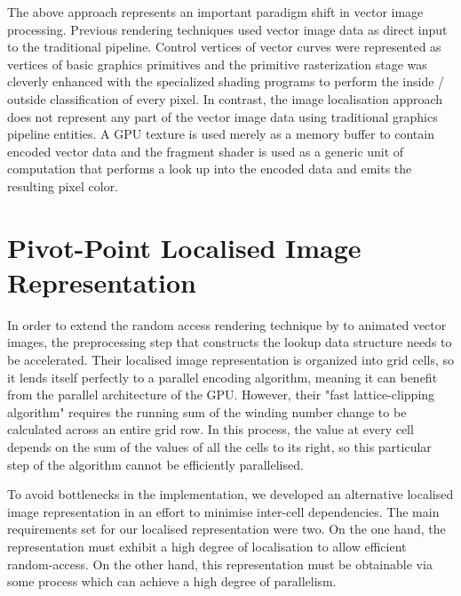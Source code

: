 \documentclass[11pt,a4paper,twoside]{article}
\begin{document}
The above approach represents an important paradigm shift in vector image processing. Previous rendering techniques used vector image data as direct input to the traditional pipeline. Control vertices of vector curves were represented as vertices of basic graphics primitives and the primitive rasterization stage was cleverly enhanced with the specialized shading programs to perform the inside / outside classification of every pixel. In contrast, the image localisation approach does not represent any part of the vector image data using traditional graphics pipeline entities. A GPU texture is used merely as a memory buffer to contain encoded vector data and the fragment shader is used as a generic unit of computation that performs a look up into the encoded data and emits the resulting pixel color.

\section {Pivot-Point Localised Image Representation}

In order to extend the random access rendering technique by \cite{NehabHoppe08} to animated vector images, the preprocessing step that constructs the lookup data structure needs to be accelerated. Their localised image representation is organized into grid cells, so it lends itself perfectly to a parallel encoding algorithm, meaning it can benefit from the parallel architecture of the GPU. However, their "fast lattice-clipping algorithm" requires the running sum of the winding number change to be calculated across an entire grid row. In this process, the value at every cell depends on the sum of the values of all the cells to its right, so this particular step of the algorithm cannot be efficiently parallelised.

To avoid bottlenecks in the implementation, we developed an alternative localised image representation in an effort to minimise inter-cell dependencies. The main requirements set for our localised representation were two. On the one hand, the representation must exhibit a high degree of localisation to allow efficient random-access. On the other hand, this representation must be obtainable via some process which can achieve a high degree of parallelism. 
\end{document}

